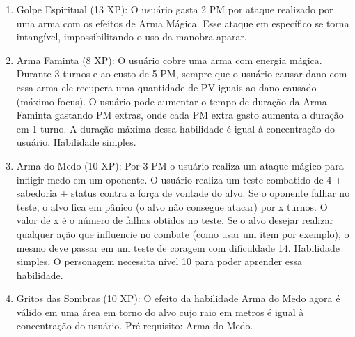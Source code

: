 \begin{enumerate}
  \item Golpe Espiritual (13 XP): O usuário gasta 2 PM por ataque realizado por uma arma com os efeitos de Arma Mágica. Esse ataque em específico se torna intangível, impossibilitando o uso da manobra aparar.    
    	
    
  
  	\item Arma Faminta (8 XP): O usuário cobre uma arma com energia mágica. Durante 3 turnos e ao custo de 5 PM, sempre que o usuário causar dano com essa arma ele recupera uma quantidade de PV iguais ao dano causado (máximo focus). O usuário pode aumentar o tempo de duração da Arma Faminta gastando PM extras, onde cada PM extra gasto aumenta a duração em 1 turno. A duração máxima dessa habilidade é igual à concentração do usuário. Habilidade simples.
  	
  	\item Arma do Medo (10 XP): Por 3 PM o usuário realiza um ataque mágico para infligir medo em um oponente. O usuário realiza um teste combatido de 4 + sabedoria + status contra a força de vontade do alvo. Se o oponente falhar no teste, o alvo fica em pânico (o alvo não consegue atacar) por x turnos. O valor de x é o número de falhas obtidos no teste. Se o alvo desejar realizar qualquer ação que influencie no combate (como usar um item por exemplo), o mesmo deve passar em um teste de coragem com dificuldade 14. Habilidade simples. O personagem necessita nível 10 para poder aprender essa habilidade.
  	
  	\item Gritos das Sombras (10 XP): O efeito da habilidade Arma do Medo agora é válido em uma área em torno do alvo cujo raio em metros é igual à concentração do usuário. Pré-requisito: Arma do Medo.
  

\end{enumerate}
